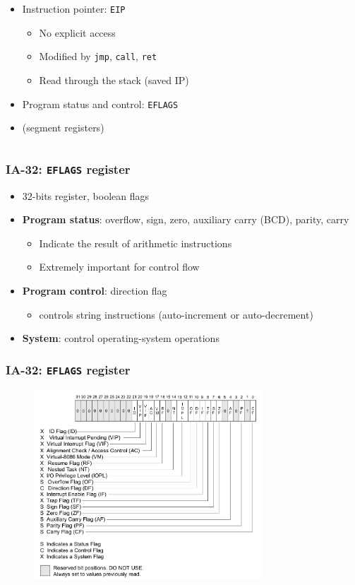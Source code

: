 \documentclass[]{beamer}
\begin{document}
\begin{frame}
\begin{columns}
\begin{column}{2.7in}
\begin{itemize}
\begin{itemize}
	      		\end{itemize}
	      		\item Instruction pointer: {\tt EIP}
	      		\begin{itemize}
	      			\item No explicit access
	      			\item Modified by {\tt jmp}, {\tt call}, {\tt ret}
	      			\item Read through the stack (saved IP)
	      		\end{itemize}
	      		\item Program status and control: {\tt EFLAGS}
	      		\item (segment registers)
	      	\end{itemize}
    	\end{column}
  	\end{columns}
\end{frame}

\begin{frame}
	\frametitle{IA-32: {\tt EFLAGS} register}
  	\begin{itemize}
  		\item 32-bits register, boolean flags
  		\item \textbf{Program status}: overflow, sign, zero, auxiliary carry (BCD), parity, carry
  		\begin{itemize}
  			\item Indicate the result of arithmetic instructions
  			\item Extremely important for control flow
  		\end{itemize}
  		\item \textbf{Program control}: direction flag
  		\begin{itemize}
  			\item controls string instructions (auto-increment or auto-decrement)
  		\end{itemize}
  		\item \textbf{System}: control operating-system operations
  \end{itemize}
 \end{frame}

 \begin{frame}
	\frametitle{IA-32: {\tt EFLAGS} register}
	\begin{figure}
    	\includegraphics[height=2.8in]{images/intel-manual-eflags.png}
  	\end{figure}
\end{frame}
\end{document}
